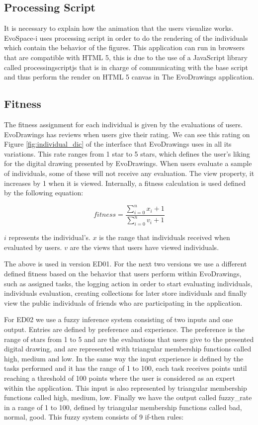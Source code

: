 \subsection{Processing Script}
It is necessary to explain how the animation
that the users visualize works. EvoSpace-i uses processing script in order to do
the rendering of the individuals which contain the behavior of the figures. This
application can run in browsers that are compatible with HTML 5, this is due to
the use of a JavaScript library called processingscriptjs that is in charge of
communicating with the base script and thus perform the render on HTML 5 canvas
in The EvoDrawings application.

\subsection{Fitness}
The fitness assignment for each individual is given by the
evaluations of users. EvoDrawings has reviews when users give their
rating. We can see this rating on Figure \ref{fig:individual_dic} of the
interface that EvoDrawings uses in all its variations. This rate ranges from 1
star to 5 stars, which defines the user's liking for the digital drawing
presented by EvoDrawings. When users evaluate a sample of individuals, some of
these will not receive any evaluation. The view property, it increases by 1 when
it is viewed. Internally, a fitness calculation is used defined by the following
equation:

\begin{equation}\label{eq:fitfunc01}
\displaystyle fitness=\frac{\sum_{i=0}^{n}x_{i}+ 1}{\sum_{i=0}^{n}v_{i} + 1}
\end{equation}

$i$ represents the individual's.
$x$ is the range that individuals received when evaluated by users.
$v$ are the views that users have viewed individuals.

The above is used in version ED01. For the next two versions we use a different
defined fitness based on the behavior that users perform within EvoDrawings,
such as assigned tasks, the logging action in order to start evaluating
individuals, individuals evaluation, creating collections for later store
individuals and finally view the public individuals of friends who are
participating in the application.

For ED02 we use a fuzzy inference system consisting of two inputs and one
output. Entries are defined by preference and experience. The preference is the
range of stars from 1 to 5 and are the evaluations that users give to the
presented digital drawing, and are represented with triangular membership
functions called high, medium and low. In the same way the input experience is
defined by the tasks performed and it has the range of 1 to 100, each task
receives points until reaching a threshold of 100 points where the user is
considered as an expert within the application. This input is also represented
by triangular membership functions called high, medium, low. Finally we have the
output called fuzzy\_rate in a range of 1 to 100, defined by triangular
membership functions called bad, normal, good. This fuzzy system consists of 9
if-then rules:

